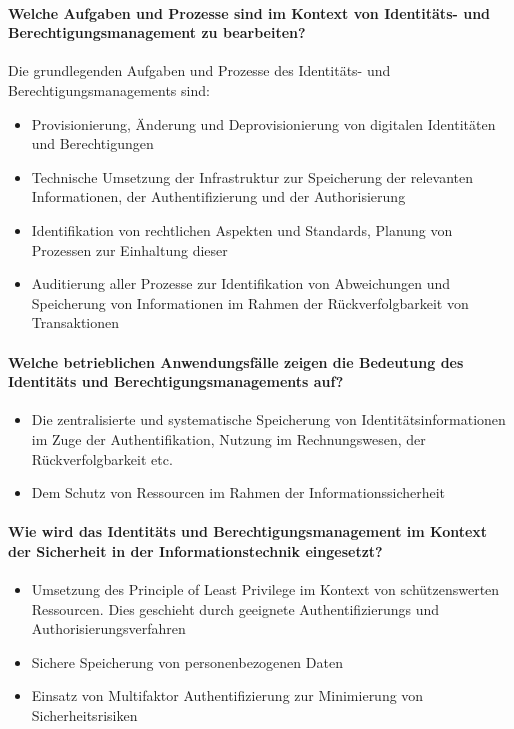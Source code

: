 \documentclass[11pt]{article}
\begin{document}
\paragraph{Welche Aufgaben und Prozesse sind im Kontext von Identitäts- und Berechtigungsmanagement zu bearbeiten?}
Die grundlegenden Aufgaben und Prozesse des Identitäts- und Berechtigungsmanagements sind:
\begin{itemize}
  \item Provisionierung, Änderung und Deprovisionierung von digitalen Identitäten und Berechtigungen
  \item Technische Umsetzung der Infrastruktur zur Speicherung der relevanten Informationen, der Authentifizierung und der Authorisierung
  \item Identifikation von rechtlichen Aspekten und Standards, Planung von Prozessen zur Einhaltung dieser
  \item Auditierung aller Prozesse zur Identifikation von Abweichungen und Speicherung von Informationen im Rahmen der Rückverfolgbarkeit von Transaktionen
\end{itemize}
\paragraph{Welche betrieblichen Anwendungsfälle zeigen die Bedeutung des Identitäts und Berechtigungsmanagements auf?}
\begin{itemize}
  \item Die zentralisierte und systematische Speicherung von Identitätsinformationen im Zuge der Authentifikation, Nutzung im Rechnungswesen, der Rückverfolgbarkeit etc.
  \item Dem Schutz von Ressourcen im Rahmen der Informationssicherheit
\end{itemize}
\paragraph{Wie wird das Identitäts und Berechtigungsmanagement im Kontext der Sicherheit in der Informationstechnik eingesetzt?}
\begin{itemize}
  \item Umsetzung des Principle of Least Privilege im Kontext von schützenswerten Ressourcen. Dies geschieht durch geeignete Authentifizierungs und Authorisierungsverfahren
  \item Sichere Speicherung von personenbezogenen Daten
  \item Einsatz von Multifaktor Authentifizierung zur Minimierung von Sicherheitsrisiken
\end{itemize}
\end{document}
